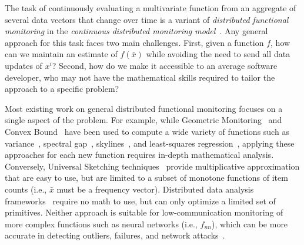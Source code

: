 The task of continuously evaluating a multivariate function from an aggregate of several data vectors that change over time is a variant of \emph{distributed functional monitoring} in the \emph{continuous distributed monitoring model}~\cite{woodruff2012,2011_ke_yidistributed_functional_monitoring,cormode2013}.
Any general approach for this task faces two main challenges.
First, given a function $f$, how can we maintain an estimate of $f(\bar{x})$ while avoiding the need to send all data updates of $x^i$? 
Second, how do we make it accessible to an average software developer, who may not have the mathematical skills required to tailor the approach to a specific problem?


Most existing work on general distributed functional monitoring focuses on a single aspect of the problem.
For example, while Geometric Monitoring~\cite{2008_shape_sensitive_gm, lazerson:one_for_all} and Convex Bound~\cite{lazerson:lightweight_monitoring} have been used to compute a wide variety of functions such as variance~\cite{gabel:variance_monitoring}, spectral gap~\cite{yeuda2017graph}, skylines~\cite{papapetrou2014skylines}, and least-squares regression~\cite{gabel:monitoring_least_squares}, applying these approaches for each new function requires in-depth mathematical analysis.
Conversely,  Universal Sketching techniques~\cite{zero_one_frequency_laws} provide multiplicative approximation that are easy to use, but are limited to a subset of monotone functions of item counts (i.e., $\bar{x}$ must be a frequency vector).
Distributed data analysis frameworks~\cite{flink,2018_sonata,mortazavi2020feather,nemo,univmon_2016} 
require no math to use, but can only optimize a limited set of primitives.\footnotemark{} 
Neither approach is suitable for low-communication monitoring of more complex functions such as neural networks (i.e., $f_{nn}$), which can be more accurate in detecting outliers, failures, and network attacks~\cite{10.1016/j.cose.2014.05.011, 10.4108/eai.3-12-2015.2262516}.



